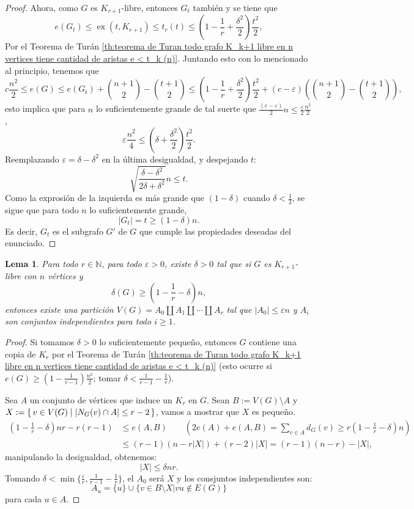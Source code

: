 \documentclass[12pt]{report}
\theoremstyle{plain}
\newtheorem{lemma}[theorem]{Lema}
\theoremstyle{definition}
\newcommand{\naturals}{\mathbb{N}}
\newcommand{\abs}[1]{\left \vert #1 \right \vert}
\newcommand{\ex}[2]{\operatorname{ex} (#1, #2)}
\begin{document}
\begin{proof}
Ahora, como $G$ es $K_{r+1}$-libre, entonces $G_t$ también y se tiene que
\[
    e(G_t) \leq \ex t {K_{r+1}} \leq t_r (t) \leq \left (1 - \frac 1 r + \frac{\delta^2}{2} \right) \frac{t^2}{2},
\]
Por el Teorema de Turán \ref{th:teorema de Turan todo grafo K_k+1 libre en n vertices tiene cantidad de aristas e < t_k (n)}. Juntando esto con lo mencionado al principio, tenemos que
\[
    c \frac{n^2}{2} \leq e(G) \leq e (G_t) + \binom{n+1}2 - \binom{t+1}{2} \leq \left (1 - \frac 1 r + \frac{ \delta^2}2 \right) \frac{t^2}{2} + (c- \varepsilon) \left (\binom{n+1}2 - \binom{t+1}2\right ),
\]
esto implica que para $n$ lo suficientemente grande de tal suerte que $\frac{(c - \varepsilon)}{2} n \leq \frac{\varepsilon }{2} \frac{n^2}{2}$,
\[
    \varepsilon \frac{n^2}{4}  \leq (\delta + \frac{\delta^2}{2}) \frac{t^2}{2}.
\]
Reemplazando $\varepsilon = \delta - \delta^2$ en la última desigualdad, y despejando $t$:
\[
    \sqrt{\frac{\delta - \delta^2}{2 \delta + \delta^2}} n \leq t.
\]
Como la exprosión de la izquierda es más grande que $(1 - \delta)$ cuando $\delta < \frac 1 2$, se sigue que para todo $n$ lo suficientemente grande,
\[
    \abs {G_t}  = t \geq (1 - \delta) n.
\]
Es decir, $G_t$ es el subgrafo $G'$ de $G$ que cumple las propiedades deseadas del enunciado.
\end{proof}

\begin{lemma}\label{lemma: Teorema de Estabilidad de Erdos-simonovits - lema 2}
Para todo $r \in \naturals$, para todo $\varepsilon > 0$, existe $\delta > 0$ tal que si $G$ es $K_{r+1}$-libre con $n$ vértices y
\[
    \delta (G) \geq \left ( 1 - \frac 1 r - \delta \right) n,
\]
entonces existe una partición $V(G) = A_0 \coprod A_1 \coprod \cdots \coprod A_r$ tal que $\abs {A_0} \leq \varepsilon n$ y $A_i$ son conjuntos independientes para todo $i \geq 1$.
\end{lemma}
\begin{proof}
Si tomamos $\delta >0$ lo suficientemente pequeño, entonces $G$ contiene una copia de $K_r$ por el Teorema de Turán \ref{th:teorema de Turan todo grafo K_k+1 libre en n vertices tiene cantidad de aristas e < t_k (n)} (esto ocurre si $e(G) \geq \left ( 1 - \frac 1 {r-1} \right)\frac{n^2}{2}$; tomar $\delta < \frac 1 {r-1} - \frac 1 r$).

Sea $A$ un conjunto de vértices que induce un $K_r$ en $G$. Sean $B := V(G) \setminus A$ y $X := \set{v \in V(G) | \abs{N_G (v) \cap A} \leq r -2}$, vamos a mostrar que $X$ es pequeño.
\begin{align*}
\left ( 1 - \frac 1 r - \delta \right ) n r - r (r-1) &\leq e(A, B) \quad \quad \left ( 2 e(A) + e(A,B) = \sum_{v \in A} d_G (v) \geq r \left (1 - \frac 1 r - \delta \right )n \right )\\
                &\leq (r-1) (n-r \abs X) + (r-2) \abs X  = (r-1) (n-r) - \abs X,
\end{align*}
manipulando la desigualdad, obtenemos:
\[
    \abs X \leq \delta n r.
\]
Tomando $\delta < \min \{\frac{\varepsilon}{r}, \frac 1{r-1} - \frac 1 r\}$, el $A_0$ será $X$ y los consjuntos independientes son:
\[
    A_u = \{u\} \cup \{v \in B \setminus X | vu \not \in E(G)\}
\]
para cada $u \in A$.
\end{proof}
\end{document}

